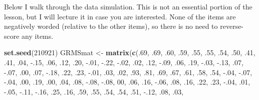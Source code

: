 \documentclass[
  english,
]{book}
\newenvironment{Shaded}{\begin{snugshade}}{\end{snugshade}}
\newcommand{\DecValTok}[1]{\textcolor[rgb]{0.00,0.00,0.81}{#1}}
\newcommand{\FloatTok}[1]{\textcolor[rgb]{0.00,0.00,0.81}{#1}}
\newcommand{\KeywordTok}[1]{\textcolor[rgb]{0.13,0.29,0.53}{\textbf{#1}}}
\newcommand{\NormalTok}[1]{#1}
\newcommand{\StringTok}[1]{\textcolor[rgb]{0.31,0.60,0.02}{#1}}
\begin{document}
Below I walk through the data simulation. This is not an essential portion of the lesson, but I will lecture it in case you are interested. None of the items are negatively worded (relative to the other items), so there is no need to reverse-score any items.

\begin{Shaded}
\begin{Highlighting}[]
\KeywordTok{set.seed}\NormalTok{(}\DecValTok{210921}\NormalTok{)}
\NormalTok{GRMSmat <-}\StringTok{ }\KeywordTok{matrix}\NormalTok{(}\KeywordTok{c}\NormalTok{(.}\DecValTok{69}\NormalTok{, }\FloatTok{.69}\NormalTok{, }\FloatTok{.60}\NormalTok{, }\FloatTok{.59}\NormalTok{, }\FloatTok{.55}\NormalTok{, }\FloatTok{.55}\NormalTok{, }\FloatTok{.54}\NormalTok{, }\FloatTok{.50}\NormalTok{, }\FloatTok{.41}\NormalTok{, }\FloatTok{.41}\NormalTok{, }\FloatTok{.04}\NormalTok{, }\FloatTok{-.15}\NormalTok{, }\FloatTok{.06}\NormalTok{, }\FloatTok{.12}\NormalTok{, }\FloatTok{.20}\NormalTok{, }\FloatTok{-.01}\NormalTok{, }\FloatTok{-.22}\NormalTok{, }\FloatTok{-.02}\NormalTok{, }\FloatTok{.02}\NormalTok{, }\FloatTok{.12}\NormalTok{, }\FloatTok{-.09}\NormalTok{, }\FloatTok{.06}\NormalTok{, }\FloatTok{.19}\NormalTok{, }\FloatTok{-.03}\NormalTok{, }\FloatTok{-.13}\NormalTok{,}
                  \FloatTok{.07}\NormalTok{, }\FloatTok{-.07}\NormalTok{, }\FloatTok{.00}\NormalTok{, }\FloatTok{.07}\NormalTok{, }\FloatTok{-.18}\NormalTok{, }\FloatTok{.22}\NormalTok{, }\FloatTok{.23}\NormalTok{, }\FloatTok{-.01}\NormalTok{, }\FloatTok{.03}\NormalTok{, }\FloatTok{.02}\NormalTok{, }\FloatTok{.93}\NormalTok{, }\FloatTok{.81}\NormalTok{, }\FloatTok{.69}\NormalTok{, }\FloatTok{.67}\NormalTok{, }\FloatTok{.61}\NormalTok{, }\FloatTok{.58}\NormalTok{, }\FloatTok{.54}\NormalTok{, }\FloatTok{-.04}\NormalTok{, }\FloatTok{-.07}\NormalTok{, }\FloatTok{-.04}\NormalTok{, }\FloatTok{.00}\NormalTok{, }\FloatTok{.19}\NormalTok{, }\FloatTok{.00}\NormalTok{, }\FloatTok{.04}\NormalTok{, }\FloatTok{.08}\NormalTok{,}
                  \FloatTok{-.08}\NormalTok{, }\FloatTok{-.08}\NormalTok{, }\DecValTok{00}\NormalTok{, }\FloatTok{.06}\NormalTok{, }\FloatTok{.16}\NormalTok{, }\FloatTok{-.06}\NormalTok{, }\FloatTok{.08}\NormalTok{, }\FloatTok{.16}\NormalTok{, }\FloatTok{.22}\NormalTok{, }\FloatTok{.23}\NormalTok{, }\FloatTok{-.04}\NormalTok{, }\FloatTok{.01}\NormalTok{, }\FloatTok{-.05}\NormalTok{, }\FloatTok{-.11}\NormalTok{, }\FloatTok{-.16}\NormalTok{, }\FloatTok{.25}\NormalTok{, }\FloatTok{.16}\NormalTok{, }\FloatTok{.59}\NormalTok{, }\FloatTok{.55}\NormalTok{, }\FloatTok{.54}\NormalTok{, }\FloatTok{.54}\NormalTok{, }\FloatTok{.51}\NormalTok{, }\FloatTok{-.12}\NormalTok{, }\FloatTok{.08}\NormalTok{, }\FloatTok{.03}\NormalTok{,}

\end{Highlighting}
\end{Shaded}
\end{document}
